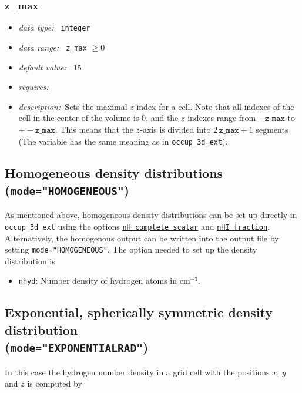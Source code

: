 \documentclass[a4paper,10pt]{article}
\begin{document}
\begin{appendix}
\subsubsection{z\_max}
\label{hydoptnl:zmax}
\begin{itemize}
 \item \textit{data type:~} \texttt{integer}
 \item \textit{data range:~} \texttt{z\_max} $\ge0$
 \item \textit{default value:~} 15
 \item \textit{requires:~}
 \item \textit{description:~}Sets the maximal $z$-index for a cell. Note that
  all indexes of the cell in the center of the volume is 0, and the  $z$ 
  indexes range from $-\mathtt{z\_max}$ to $+-\mathtt{z\_max}$. This means that 
  the $z$-axis is divided into $2\, \mathtt{z\_max} +1$ segments (The variable 
  has the same meaning as in \texttt{occup\_3d\_ext}).
\end{itemize}


\subsection{Homogeneous density distributions\\ (\texttt{mode="HOMOGENEOUS"})} 
As mentioned above, homogeneous density distributions can be set up directly in 
\texttt{occup\_3d\_ext} using the options 
\hyperref[opt:nhcompletescalar]{\texttt{nH\_complete\_scalar}} and
\hyperref[opt:nhifraction]{\texttt{nHI\_fraction}}. Alternatively, the 
homogenous output can be written into the output file by setting 
\texttt{mode="HOMOGENEOUS"}.
The option needed to set up the density distribution is 
\begin{itemize}
 \item \texttt{nhyd}: Number density of hydrogen atoms in $\mathrm{cm}^{-3}$.  
\end{itemize}

\subsection{Exponential, spherically symmetric density distribution\\ 
(\texttt{mode="EXPONENTIALRAD"})}
In this case the hydrogen number density in a grid cell with the positions $x$, 
$y$ and $z$ is computed by


\end{appendix}
\end{document}

